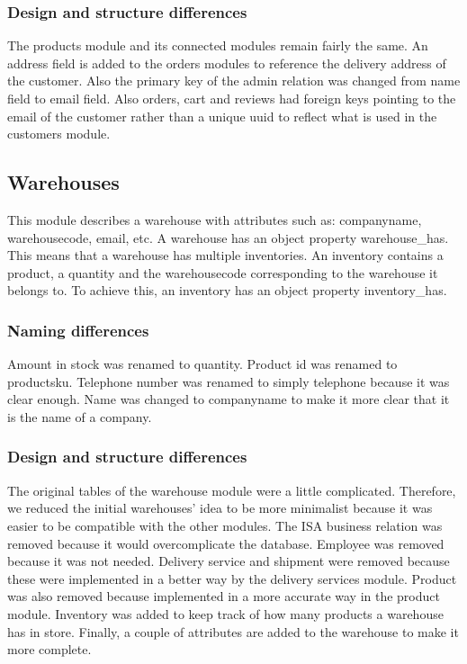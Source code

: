 \documentclass{article}
\begin{document}
\subsubsection{Design and structure differences}
The products module and its connected modules remain fairly the same. An address field is added to the orders modules to reference the delivery address of the customer. Also the primary key of the admin relation was changed from name field to email field. Also orders, cart and reviews had foreign keys pointing to the email of the customer rather than a unique uuid to reflect what is used in the customers module.


\subsection{Warehouses}
This module describes a warehouse with attributes such as: companyname, warehousecode, email, etc. A warehouse has an object property warehouse\_has. This means that a warehouse has multiple inventories. An inventory contains a product, a quantity and the warehousecode corresponding to the warehouse it belongs to. To achieve this, an inventory has an object property inventory\_has.


\subsubsection{Naming differences}
Amount in stock was renamed to quantity. Product id was renamed to productsku. Telephone number was renamed to simply telephone because it was clear enough. Name was changed to companyname to make it more clear that it is the name of a company.

\newpage
\subsubsection{Design and structure differences}
The original tables of the warehouse module were a little complicated. Therefore, we reduced the initial warehouses' idea to be more minimalist because it was easier to be compatible with the other modules. The ISA business relation was removed because it would overcomplicate the database. Employee was removed because it was not needed. Delivery service and shipment were removed because these were implemented in a better way by the delivery services module. Product was also removed because implemented in a more accurate way in the product module. Inventory was added to keep track of how many products a warehouse has in store. Finally, a couple of attributes are added to the warehouse to make it more complete.
\end{document}
